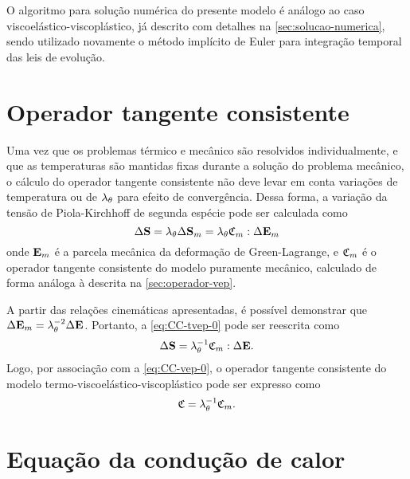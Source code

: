 \documentclass[Tese.tex]{subfiles}
\begin{document}
O algoritmo para solução numérica do presente modelo é análogo ao caso viscoelástico-viscoplástico, já descrito com detalhes na \autoref{sec:solucao-numerica}, sendo utilizado novamente o método implícito de Euler para integração temporal das leis de evolução.

\section{Operador tangente consistente}

Uma vez que os problemas térmico e mecânico são resolvidos individualmente, e que as temperaturas são mantidas fixas durante a solução do problema mecânico, o cálculo do operador tangente consistente não deve levar em conta variações de temperatura ou de $\lambda_{\theta}$ para efeito de convergência. Dessa forma, a variação da tensão de Piola-Kirchhoff de segunda espécie pode ser calculada como
\begin{equation}\label{eq:CC-tvep-0}
\Delta\mathbf{S} = \lambda_{\theta}\Delta\mathbf{S}_m = \lambda_{\theta}\mathfrak{C}_m:\Delta\mathbf{E}_m
\end{equation}
onde $\mathbf{E}_m$ é a parcela mecânica da deformação de Green-Lagrange, e $\mathfrak{C}_m$ é o operador tangente consistente do modelo puramente mecânico, calculado de forma análoga à descrita na \cref{sec:operador-vep}.

A partir das relações cinemáticas apresentadas, é possível demonstrar que $\Delta\mathbf{E}_m = \lambda_{\theta}^{-2}\Delta\mathbf{E}$. Portanto, a \cref{eq:CC-tvep-0} pode ser reescrita como
\begin{equation}
\Delta\mathbf{S} = \lambda_{\theta}^{-1}\mathfrak{C}_m:\Delta\mathbf{E}.
\end{equation}
Logo, por associação com a \cref{eq:CC-vep-0}, o operador tangente consistente do modelo termo-viscoelástico-viscoplástico pode ser expresso como
\begin{equation}
\mathfrak{C} = \lambda_{\theta}^{-1}\mathfrak{C}_m. \label{eq:CC-tvep}
\end{equation}

\section{Equação da condução de calor}\label{sec:conducao-tvep}
\end{document}
